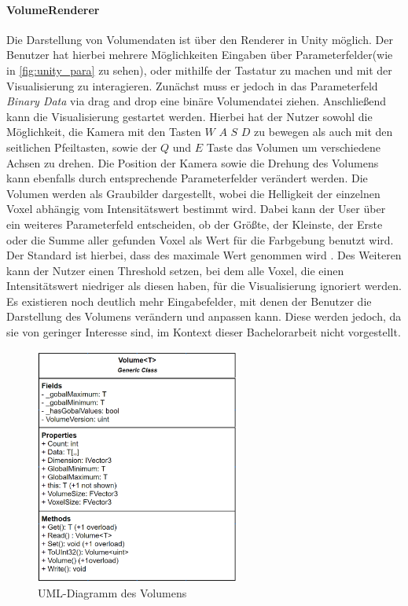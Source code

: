 \paragraph{VolumeRenderer}
Die Darstellung von Volumendaten ist über den Renderer in Unity möglich. Der Benutzer hat hierbei mehrere Möglichkeiten Eingaben über Parameterfelder(wie in \autoref{fig:unity_para} zu sehen), oder mithilfe der Tastatur zu machen und mit der Visualisierung zu interagieren. Zunächst muss er jedoch in das Parameterfeld \textit{Binary Data} via drag and drop eine binäre Volumendatei ziehen.
Anschließend kann die Visualisierung gestartet werden. Hierbei hat der Nutzer sowohl die Möglichkeit, die Kamera mit den Tasten $W$ $A$ $S$ $D$ zu bewegen als auch mit den seitlichen Pfeiltasten, sowie der $Q$ und $E$ Taste das Volumen um verschiedene Achsen zu drehen. Die Position der Kamera sowie die Drehung des Volumens kann ebenfalls durch entsprechende Parameterfelder verändert werden.
Die Volumen werden als Graubilder dargestellt, wobei die Helligkeit der einzelnen Voxel abhängig vom Intensitätswert bestimmt wird. Dabei kann der User über ein weiteres Parameterfeld entscheiden, ob der Größte, der Kleinste, der Erste oder die Summe aller gefunden Voxel als Wert für die Farbgebung benutzt wird. Der Standard ist hierbei, dass des maximale Wert genommen wird .
\newline
Des Weiteren kann der Nutzer einen Threshold setzen, bei dem alle Voxel, die einen Intensitätswert niedriger als diesen haben, für die Visualisierung ignoriert werden.
Es existieren noch deutlich mehr Eingabefelder, mit denen der Benutzer die Darstellung des Volumens verändern und anpassen kann. Diese werden jedoch, da sie von geringer Interesse sind, im Kontext dieser Bachelorarbeit nicht vorgestellt.


\begin{figure}
\centering
\includegraphics[width=0.6\textwidth]{Logos/Volume_UML.PNG}
\caption{UML-Diagramm des Volumens} 
\label{fig:volume_uml} 
\end{figure}

